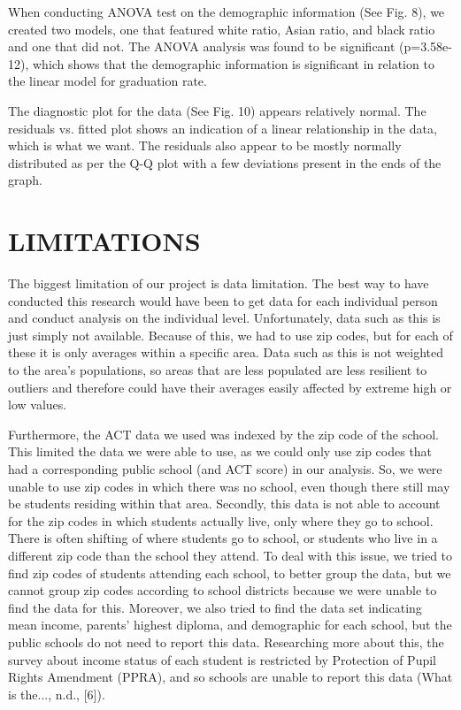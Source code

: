 \documentclass[letterpaper, 10 pt, conference]{ieeeconf}  %
\begin{document}
When conducting ANOVA test on the demographic information (See Fig. 8), we created two models, one that featured white ratio, Asian ratio, and black ratio and one that did not.
The ANOVA analysis was found to be significant (p=3.58e-12), which shows that the demographic information is significant in relation to the linear model for graduation rate.

The diagnostic plot for the data (See Fig. 10) appears relatively normal.
The residuals vs. fitted plot shows an indication of a linear relationship in the data, which is what we want.
The residuals also appear to be mostly normally distributed as per the Q-Q plot with a few deviations present in the ends of the graph. 

\section{LIMITATIONS}

The biggest limitation of our project is data limitation.
The best way to have conducted this research would have been to get data for each individual person and conduct analysis on the individual level.
Unfortunately, data such as this is just simply not available.
Because of this, we had to use zip codes, but for each of these it is only averages within a specific area.
Data such as this is not weighted to the area’s populations, so areas that are less populated are less resilient to outliers and therefore could have their averages easily affected by extreme high or low values. 

Furthermore, the ACT data we used was indexed by the zip code of the school.
This limited the data we were able to use, as we could only use zip codes that had a corresponding public school (and ACT score) in our analysis.
So, we were unable to use zip codes in which there was no school, even though there still may be students residing within that area.
Secondly, this data is not able to account for the zip codes in which students actually live, only where they go to school. 
There is often shifting of where students go to school, or students who live in a different zip code than the school they attend.
To deal with this issue, we tried to find zip codes of students attending each school, to better group the data, but we cannot group zip codes according to school districts because we were unable to find the data for this.
Moreover, we also tried to find the data set indicating mean income, parents' highest diploma, and demographic for each school, but the public schools do not need to report this data.
Researching more about this, the survey about income status of each student is restricted by Protection of Pupil Rights Amendment (PPRA), and so schools are unable to report this data (What is the..., n.d., [6]).
\end{document}
